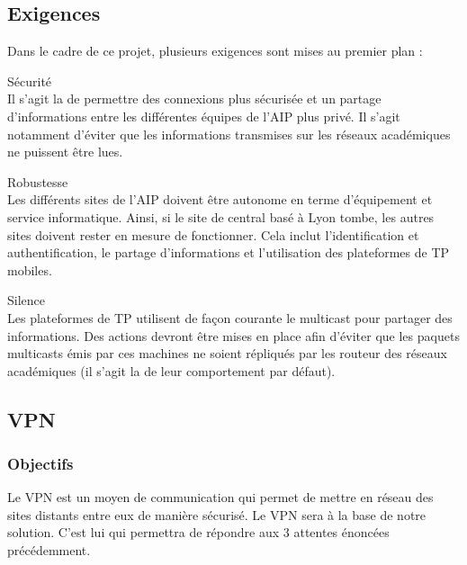 
\subsection{Exigences}
Dans le cadre de ce projet, plusieurs exigences sont mises au premier plan :
\begin{description}
\item{Sécurité}\\
	Il s'agit la de permettre des connexions plus sécurisée et un partage d'informations entre les différentes équipes de l'AIP plus privé. Il s'agit notamment d'éviter que les informations transmises sur les réseaux académiques ne puissent être lues.
   
\item{Robustesse}\\
	Les différents sites de l'AIP doivent être autonome en terme d'équipement et service informatique. Ainsi, si le site de central basé à Lyon tombe, les autres sites doivent rester en mesure de fonctionner. Cela inclut l'identification et authentification, le partage d'informations et l'utilisation des plateformes de TP mobiles.
   
\item{Silence}\\
	Les plateformes de TP utilisent de façon courante le multicast pour partager des informations. Des actions devront être mises en place afin d'éviter que les paquets multicasts émis par ces machines ne soient répliqués par les routeur des réseaux académiques (il s'agit la de leur comportement par défaut).

\end{description}
	
\subsection{VPN}
\subsubsection{Objectifs}
Le VPN est un moyen de communication qui permet de mettre en réseau des sites distants entre eux de manière sécurisé.
Le VPN sera à la base de notre solution. C'est lui qui permettra de répondre aux 3 attentes énoncées précédemment.


